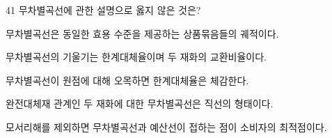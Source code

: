 \begin{question}{41}
무차별곡선에 관한 설명으로 옳지 않은 것은?
\begin{choices}
  \item 무차별곡선은 동일한 효용 수준을 제공하는 상품묶음들의 궤적이다.
  \item 무차별곡선의 기울기는 한계대체율이며 두 재화의 교환비율이다.
  \item 무차별곡선이 원점에 대해 오목하면 한계대체율은 체감한다.
  \item 완전대체재 관계인 두 재화에 대한 무차별곡선은 직선의 형태이다.
  \item 모서리해를 제외하면 무차별곡선과 예산선이 접하는 점이 소비자의 최적점이다.
\end{choices}
\end{question}
